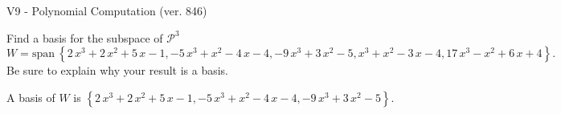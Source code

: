 \begin{exercise}
  \begin{exerciseTitle}V9 - Polynomial Computation (ver. 846)\end{exerciseTitle}
  \begin{exerciseStatement}
    Find a basis for the subspace of \(\mathcal{P}^3\) 
\[W=\mathrm{span}\ \left\{2 \, x^{3} + 2 \, x^{2} + 5 \, x - 1 , -5 \, x^{3} + x^{2} - 4 \, x - 4 , -9 \, x^{3} + 3 \, x^{2} - 5 , x^{3} + x^{2} - 3 \, x - 4 , 17 \, x^{3} - x^{2} + 6 \, x + 4\right\}.\]
 Be sure to explain why your result is a basis.


  \end{exerciseStatement}
  \begin{exerciseAnswer}
   A basis of \(W\) is  \(\left\{2 \, x^{3} + 2 \, x^{2} + 5 \, x - 1 , -5 \, x^{3} + x^{2} - 4 \, x - 4 , -9 \, x^{3} + 3 \, x^{2} - 5\right\}\).
  


  \end{exerciseAnswer}
\end{exercise}